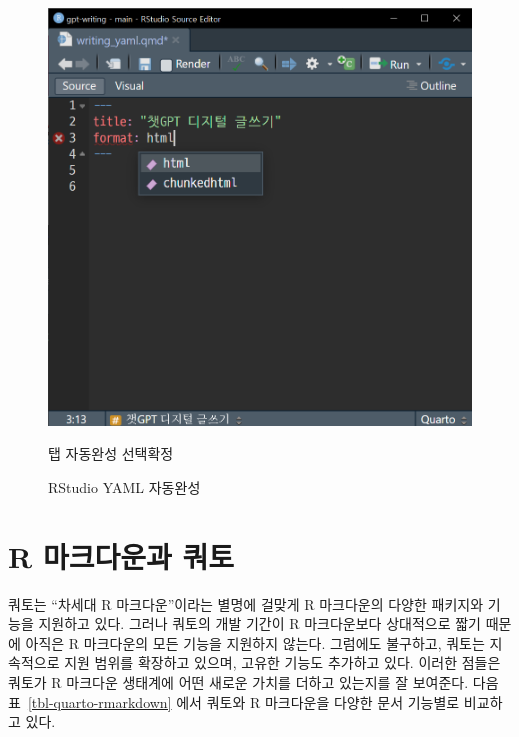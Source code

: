 \documentclass[
  letterpaper,
]{book}
\begin{document}
\begin{figure}
\begin{minipage}[t]{0.47\linewidth}
{{\includegraphics{images/yaml_after.png}

}

\caption{탭 자동완성 선택확정}

}

\end{minipage}%

\caption{\label{fig-yaml}RStudio YAML 자동완성}

\end{figure}

\hypertarget{r-uxb9c8uxd06cuxb2e4uxc6b4uxacfc-uxcffcuxd1a0}{%
\section{R 마크다운과
쿼토}\label{r-uxb9c8uxd06cuxb2e4uxc6b4uxacfc-uxcffcuxd1a0}}

{}

쿼토는 ``차세대 R 마크다운''이라는 별명에 걸맞게 R 마크다운의 다양한
패키지와 기능을 지원하고 있다. 그러나 쿼토의 개발 기간이 R 마크다운보다
상대적으로 짧기 때문에 아직은 R 마크다운의 모든 기능을 지원하지 않는다.
그럼에도 불구하고, 쿼토는 지속적으로 지원 범위를 확장하고 있으며, 고유한
기능도 추가하고 있다. 이러한 점들은 쿼토가 R 마크다운 생태계에 어떤
새로운 가치를 더하고 있는지를 잘 보여준다. 다음
표~\ref{tbl-quarto-rmarkdown} 에서 쿼토와 R 마크다운을 다양한 문서
기능별로 비교하고 있다.
\end{document}
